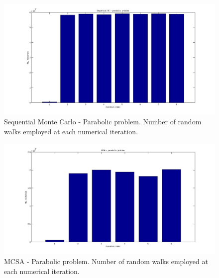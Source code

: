 \begin{figure}[h!]
  \centering
    \includegraphics[width=\textwidth]{SEQ_parabolic.jpg}
      \caption{Sequential Monte Carlo - Parabolic problem. Number of random
walks
employed at each
numerical iteration.}
\label{MCSA_parabolic}
\end{figure}


\begin{figure}[h!]
  \centering
    \includegraphics[width=\textwidth]{MCSA_parabolic.jpg}
      \caption{MCSA - Parabolic problem. Number of random walks
employed at each
numerical iteration.}
\label{MCSA_parabolic}
\end{figure}

